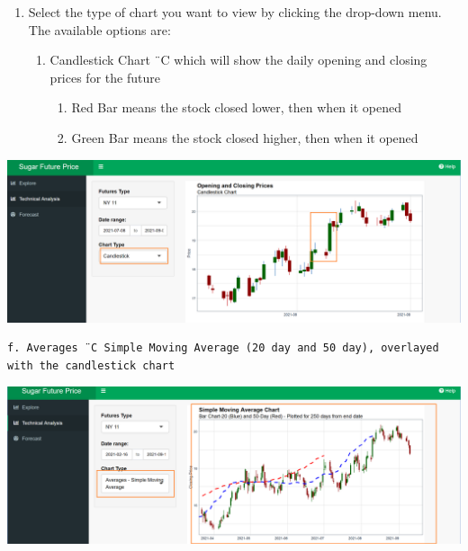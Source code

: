 \documentclass[
  12pt,
]{article}
\begin{document}
\begin{enumerate}
\def\labelenumi{\arabic{enumi}.}
\setcounter{enumi}{1}
\item
  Select the type of chart you want to view by clicking the drop-down
  menu. The available options are:

  \begin{enumerate}
  \def\labelenumii{\alph{enumii}.}
  \item
    Candlestick Chart ¨C which will show the daily opening and closing
    prices for the future

    \begin{enumerate}
    \def\labelenumiii{\roman{enumiii}.}
    \item
      Red Bar means the stock closed lower, then when it opened
    \item
      Green Bar means the stock closed higher, then when it opened
    \end{enumerate}
  \end{enumerate}
\end{enumerate}

\begin{center}\includegraphics[width=1\linewidth]{images/TA_1} \end{center}

\begin{verbatim}
f. Averages ¨C Simple Moving Average (20 day and 50 day), overlayed with the candlestick chart 
\end{verbatim}

\begin{center}\includegraphics[width=1\linewidth]{images/TA_2} \end{center}
\end{document}
